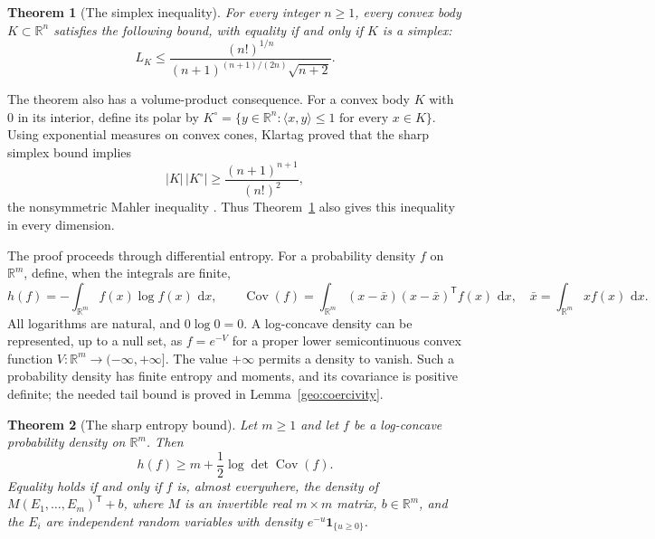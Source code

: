 \documentclass[11pt]{article}
\newcommand{\R}{\mathbb R}
\DeclareMathOperator{\Cov}{Cov}
\newcommand{\dd}{\,\mathrm d}
\newtheorem{theorem}{Theorem}[section]
\theoremstyle{definition}
\theoremstyle{remark}
\numberwithin{equation}{section}
\begin{document}
\begin{theorem}[The simplex inequality]\label{intro:simplex}
For every integer $n\ge1$, every convex body $K\subset\R^n$ satisfies
the following bound, with equality if and only if $K$ is a simplex:
\begin{equation}\label{intro:simplex-bound}
 L_K\le
 \frac{(n!)^{1/n}}{(n+1)^{(n+1)/(2n)}\sqrt{n+2}}.
\end{equation}
\end{theorem}

The theorem also has a volume-product consequence.  For a convex body
$K$ with $0$ in its interior, define its polar by
$K^\circ=\{y\in\R^n:\langle x,y\rangle\le1\text{ for every }x\in K\}$.
Using exponential measures on convex cones, Klartag proved that the
sharp simplex bound implies
\begin{equation}\label{intro:mahler}
 |K|\,|K^\circ|\ge\frac{(n+1)^{n+1}}{(n!)^2},
\end{equation}
the nonsymmetric Mahler inequality
\cite[Corollary~1.2]{Klartag2018}.  Thus Theorem~\ref{intro:simplex}
also gives this inequality in every dimension.

The proof proceeds through differential entropy.  For a probability
density $f$ on $\R^m$, define, when the integrals are finite,
\[
 h(f)=-\int_{\R^m}f(x)\log f(x)\,\dd x,
 \qquad
 \Cov(f)=\int_{\R^m}(x-\bar x)(x-\bar x)^{\mathsf T}f(x)\,\dd x,
 \quad \bar x=\int_{\R^m}xf(x)\,\dd x.
\]
All logarithms are natural, and $0\log0=0$.  A log-concave density can
be represented, up to a null set, as $f=e^{-V}$ for a proper lower
semicontinuous convex function $V:\R^m\to(-\infty,+\infty]$.
The value $+\infty$ permits a density to vanish.  Such a probability
density has finite entropy and moments, and its covariance is positive
definite; the needed tail bound is proved in Lemma~\ref{geo:coercivity}.

\begin{theorem}[The sharp entropy bound]\label{intro:entropy}
Let $m\ge1$ and let $f$ be a log-concave probability density on $\R^m$.
Then
\begin{equation}\label{intro:entropy-bound}
 h(f)\ge m+\frac12\log\det\Cov(f).
\end{equation}
Equality holds if and only if $f$ is, almost everywhere, the density
of $M(E_1,\ldots,E_m)^{\mathsf T}+b$, where $M$ is an invertible real
$m\times m$ matrix, $b\in\R^m$, and the $E_i$ are independent random
variables with density $e^{-u}\mathbf1_{\{u\ge0\}}$.
\end{theorem}
\end{document}
